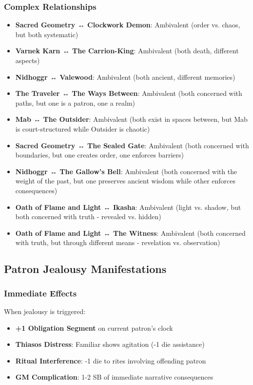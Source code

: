 \documentclass[12pt,twoside]{book}
\begin{document}
\subsubsection{Complex Relationships}
\begin{itemize}
\item \textbf{Sacred Geometry ↔ Clockwork Demon}: Ambivalent (order vs. chaos, but both systematic)
\item \textbf{Varnek Karn ↔ The Carrion-King}: Ambivalent (both death, different aspects)
\item \textbf{Nidhoggr ↔ Valewood}: Ambivalent (both ancient, different memories)
\item \textbf{The Traveler ↔ The Ways Between}: Ambivalent (both concerned with paths, but one is a patron, one a realm)
\item \textbf{Mab ↔ The Outsider}: Ambivalent (both exist in spaces between, but Mab is court-structured while Outsider is chaotic)
\item \textbf{Sacred Geometry ↔ The Sealed Gate}: Ambivalent (both concerned with boundaries, but one creates order, one enforces barriers)
\item \textbf{Nidhoggr ↔ The Gallow's Bell}: Ambivalent (both concerned with the weight of the past, but one preserves ancient wisdom while other enforces consequences)
\item \textbf{Oath of Flame and Light ↔ Ikasha}: Ambivalent (light vs. shadow, but both concerned with truth - revealed vs. hidden)
\item \textbf{Oath of Flame and Light ↔ The Witness}: Ambivalent (both concerned with truth, but through different means - revelation vs. observation)
\end{itemize}

\subsection{Patron Jealousy Manifestations}

\subsubsection{Immediate Effects}
When jealousy is triggered:
\begin{itemize}
\item \textbf{+1 Obligation Segment} on current patron's clock
\item \textbf{Thiasos Distress}: Familiar shows agitation (-1 die assistance)
\item \textbf{Ritual Interference}: -1 die to rites involving offending patron
\item \textbf{GM Complication}: 1-2 SB of immediate narrative consequences
\end{itemize}
\end{document}
